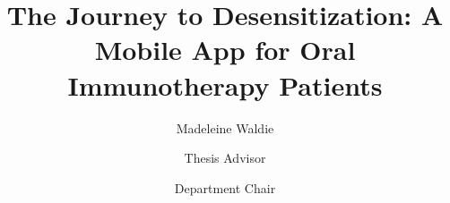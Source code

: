 \documentclass{scu-thesis}
\author{Madeleine Waldie}
\title{The Journey to Desensitization: A Mobile App for Oral Immunotherapy Patients}
\begin{document}
\frontmatter
\signature{Thesis Advisor}
\signature{Department Chair}

\maketitle


\tableofcontents
\listoftables
\listoffigures

\mainmatter
















\backmatter
\end{document}
